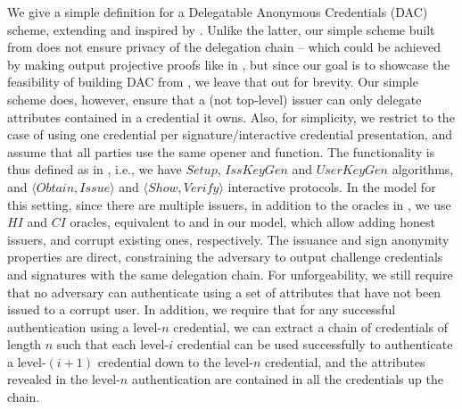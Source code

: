 We give a simple definition for a Delegatable Anonymous Credentials (DAC)
scheme, extending \cite{fhs19} and inspired by \cite{bcc+09}. Unlike the latter,
our simple scheme built from \CUASGen does not ensure privacy of the delegation
chain -- which could be achieved by making \feval output projective proofs like
in \cite{bcc+09}, but since our goal is to showcase the feasibility of building
DAC from \UAS, we leave that out for brevity. Our simple scheme does, however,
ensure that a (not top-level) issuer can only delegate attributes contained in a
credential it owns. Also, for simplicity, we restrict to the case of using one
credential per signature/interactive credential presentation, and assume that
all parties use the same opener and \finsp function.
%
The functionality is thus defined as in , i.e.,
we have $Setup$, $IssKeyGen$ and $UserKeyGen$ algorithms, and $\langle Obtain,
Issue \rangle$ and $\langle Show,Verify \rangle$ interactive protocols.
%
In the model for this setting, since there are multiple issuers, in addition
to the oracles in , we use $HI$ and $CI$ oracles,
equivalent to \IGEN and \ICORR in our \UAS model, which allow adding honest
issuers, and corrupt existing ones, respectively. The issuance and sign
anonymity properties are direct, constraining the adversary to output challenge
credentials and signatures with the same delegation chain. For unforgeability,
we still require that no adversary can authenticate using a set of attributes
that have not been issued to a corrupt user. In addition, we require that for
any successful authentication using a level-$n$ credential, we
can extract a chain of credentials of length $n$ such that each level-$i$
credential can be used successfully to authenticate a level-$(i+1)$ credential
down to the level-$n$ credential, and the attributes revealed in the
level-$n$ authentication are contained in all the credentials up the chain.

